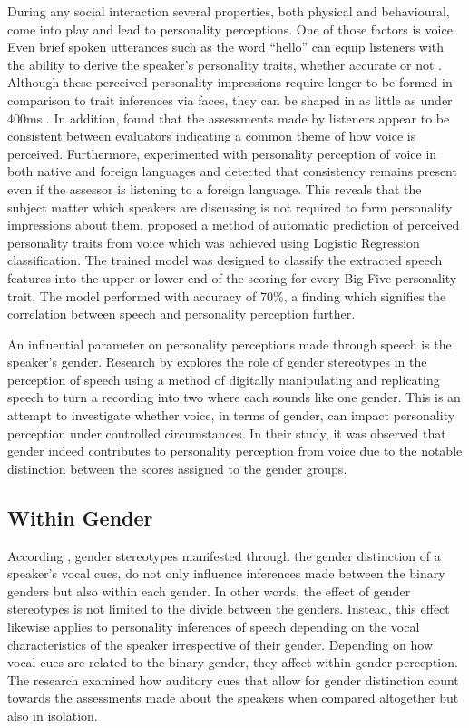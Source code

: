 \documentclass{l4proj}
\begin{document}
During any social interaction several properties, both physical and behavioural, come into play and lead to personality perceptions. One of those factors is voice. Even brief spoken utterances such as the word “hello” can equip listeners with the ability to derive the speaker’s personality traits, whether accurate or not \citep{McAleer2014}. Although these perceived personality impressions require longer to be formed in comparison to trait inferences via faces, they can be shaped in as little as under 400ms \citep{Mileva2023}.
In addition, \citet{Mileva2023} found that the assessments made by listeners appear to be consistent between evaluators indicating a common theme of how voice is perceived. Furthermore, \citet{Baus2019} experimented with personality perception of voice in both native and foreign languages and detected that consistency remains present even if the assessor is listening to a foreign language. This reveals that the subject matter which speakers are discussing is not required to form personality impressions about them.
\citet{Mohammadi2012} proposed a method of automatic prediction of perceived personality traits from voice which was achieved using Logistic Regression classification. The trained model was designed to classify the extracted speech features into the upper or lower end of the scoring for every Big Five personality trait. The model performed with accuracy of 70\%, a finding which signifies the correlation between speech and personality perception further.

An influential parameter on personality perceptions made through speech is the speaker’s gender.
Research by \citet{Dennhag2019} explores the role of gender stereotypes in the perception of speech using a method of digitally manipulating and replicating speech to turn a recording into two where each sounds like one gender. This is an attempt to investigate whether voice, in terms of gender, can impact personality perception under controlled circumstances. In their study, it was observed that gender indeed contributes to personality perception from voice due to the notable distinction between the scores assigned to the gender groups.


\subsection{Within Gender}
\label{sec:Within_gender}
According \citet{Ko2006}, gender stereotypes manifested through the gender distinction of a speaker's vocal cues, do not only influence inferences made between the binary genders but also within each gender. In other words, the effect of gender stereotypes is not limited to the divide between the genders. Instead, this effect likewise applies to personality inferences of speech depending on the vocal characteristics of the speaker irrespective of their gender. Depending on how vocal cues are related to the binary gender, they affect within gender perception.
The research examined how auditory cues that allow for gender distinction count towards the assessments made about the speakers when compared altogether but also in isolation. 
\end{document}

